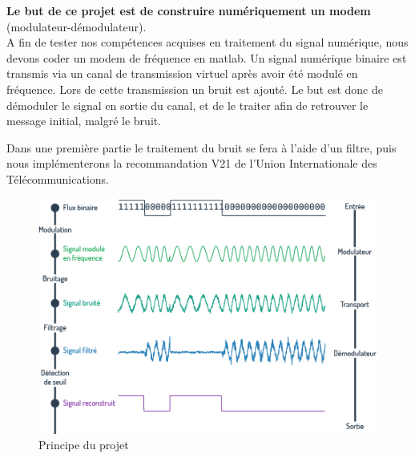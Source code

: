 
\textbf{Le but de ce projet est de construire numériquement un modem} (modulateur-démodulateur). \\
A fin de tester nos compétences acquises en traitement du signal numérique, nous devons coder un modem
de fréquence en matlab.
Un signal numérique binaire est transmis via un canal de transmission virtuel après avoir été modulé en
fréquence. Lors de cette transmission un bruit est ajouté. Le but est donc de démoduler le signal en
sortie du canal, et de le traiter afin de retrouver le message initial, malgré le bruit.

Dans une première partie le traitement du bruit se fera à l'aide d'un filtre, puis nous implémenterons
la recommandation V21 de l’Union Internationale des Télécommunications.

\begin{figure}[ht!]
   \centering
   \includegraphics[scale=0.4]{partie-1/sous-partie-1/but}
   \caption{Principe du projet \label{fig : principe_projet}}
\end{figure}